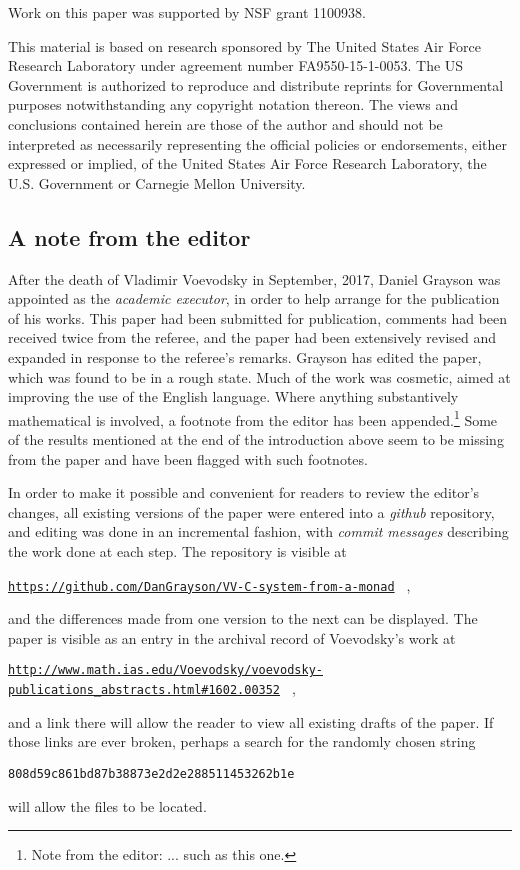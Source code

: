 \documentclass[onecolumn,12pt]{amsart}
\numberwithin{proposition}{subsection}
\newcommand{\editorfootnote}[1]{\footnote{Note from the editor: #1}}
\begin{document}
Work on this paper was supported by NSF grant 1100938.

This material is based on research sponsored by The United States Air
  Force Research Laboratory under agreement number FA9550-15-1-0053. The US
  Government is authorized to reproduce and distribute reprints for
  Governmental purposes notwithstanding any copyright notation thereon.
The views and conclusions contained herein are those of the author and should
not be interpreted as necessarily representing the official policies or
endorsements, either expressed or implied, of the United States Air Force
Research Laboratory, the U.S. Government or Carnegie Mellon University.

\subsection{A note from the editor}

After the death of Vladimir Voevodsky in
September, 2017, Daniel Grayson was appointed as the {\em academic executor},
in order to help arrange for the publication of his works.  This paper had been
submitted for publication, comments had been received twice from the referee,
and the paper had been extensively revised and expanded in response to the
referee's remarks.  Grayson has edited the paper, which was found
to be in a rough state.  Much of the work was cosmetic, aimed at improving the
use of the English language.  Where anything substantively mathematical is
involved, a footnote from the editor has been appended.\editorfootnote{... such
  as this one.}  Some of the results mentioned at the end of the introduction above
seem to be missing from the paper and have been flagged with such footnotes.

In order to make it possible and convenient for readers to review the editor's
changes, all existing versions of the paper were entered into a {\em github}
repository, and editing was done in an incremental fashion, with {\em commit
  messages} describing the work done at each step.  The repository is visible
at
\hfill\break\centerline{\tiny{\tt \href{https://github.com/DanGrayson/VV-C-system-from-a-monad}{https://github.com/DanGrayson/VV-C-system-from-a-monad}%
  } ,}
and the differences made from one version to the next can be displayed.
The paper is visible as an entry in the archival record of Voevodsky's work at
\hfill\break\centerline{\tiny{\tt \href{http://www.math.ias.edu/Voevodsky/voevodsky-publications\_abstracts.html\#1602.00352}{http://www.math.ias.edu/Voevodsky/voevodsky-publications\_abstracts.html\#1602.00352}%
  } ,}
and a link there will allow the reader to view all existing drafts of the paper.
If those links are ever broken, perhaps a search for the randomly chosen string
\hfill\break\centerline{\tiny{\tt 808d59c861bd87b38873e2d2e288511453262b1e}}
will allow the files to be located.
\end{document}
